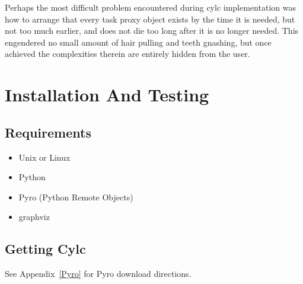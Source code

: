 \documentclass[11pt,a4paper]{article}
\begin{document}

Perhaps the most difficult problem encountered during cylc
implementation was how to arrange that every task proxy object exists by
the time it is needed, but not too much earlier, and does not die too
long after it is no longer needed. This engendered no small amount
of hair pulling and teeth gnashing, but once achieved the complexities
therein are entirely hidden from the user.




\pagebreak
\section{Installation And Testing} 
\label{InstallationAndTesting}

\subsection{Requirements} 
\label{Requirements}

\begin{itemize}
    \item Unix or Linux
    \item Python
    \item Pyro (Python Remote Objects)
    \item graphviz
\end{itemize}

\subsection{Getting Cylc} 
\label{GettingCylc}

See Appendix~\ref{Pyro} for Pyro download directions.
\end{document}

